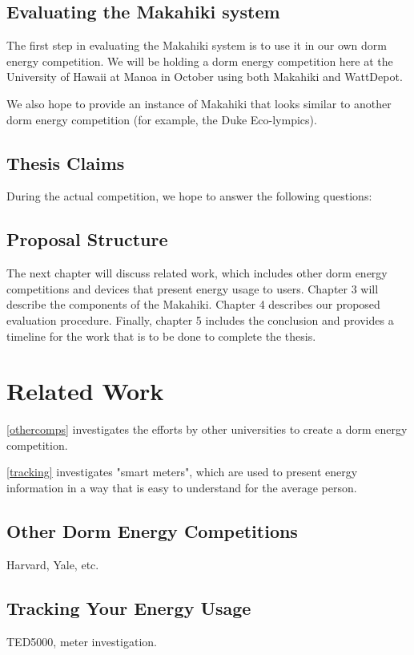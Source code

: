 \section{Evaluating the Makahiki system}

The first step in evaluating the Makahiki system is to use it in our own dorm energy competition.  We will be holding a dorm energy competition here at the University of Hawaii at Manoa in October using both Makahiki and WattDepot.

We also hope to provide an instance of Makahiki that looks similar to another dorm energy competition (for example, the Duke Eco-lympics).

\section{Thesis Claims}

During the actual competition, we hope to answer the following questions:

\section{Proposal Structure}

The next chapter will discuss related work, which includes other dorm energy competitions and devices that present energy usage to users.  Chapter 3 will describe the components of the Makahiki.  Chapter 4 describes our proposed evaluation procedure.  Finally, chapter 5 includes the conclusion and provides a timeline for the work that is to be done to complete the thesis.

\chapter{Related Work}

\autoref{othercomps} investigates the efforts by other universities to create a dorm energy competition.

\autoref{tracking} investigates "smart meters", which are used to present energy information in a way that is easy to understand for the average person.

\section{Other Dorm Energy Competitions}
\label{othercomps}
Harvard, Yale, etc.

\section{Tracking Your Energy Usage}
\label{tracking}
TED5000, meter investigation.

